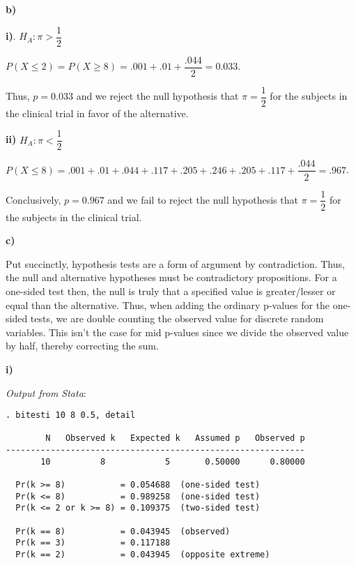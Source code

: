 \documentclass{article}
\begin{document}
\textbf{b)}


\textbf{i)}.  $H_A: \pi > \dfrac{1}{2}$

$P(X \leq 2)= P(X \geq 8)= .001 + .01 + \dfrac{.044}{2} = 0.033$.
\newline

Thus, $p = 0.033$ and we reject the null hypothesis that $\pi=\dfrac{1}{2}$ for the subjects in the clinical trial in favor of the alternative.

\textbf{ii)}  $H_A: \pi < \dfrac{1}{2}$

$P(X \leq 8)= .001+.01+.044+.117 +.205 +.246 +.205 +.117 +\dfrac{.044}{2}=.967$.

Conclusively, $p=0.967$ and we fail to reject the null hypothesis that $\pi=\dfrac{1}{2}$ for the subjects in the clinical trial.

\textbf{c)}

Put succinctly, hypothesis tests are a form of argument by contradiction. Thus, the null and alternative hypotheses must be contradictory propositions. For a one-sided test then, the null is truly that a specified value is greater/lesser or equal than the alternative. Thus, when adding the ordinary p-values for the one-sided tests, we are double counting the observed value for discrete random variables. This isn’t the case for mid p-values since we divide the observed value by half, thereby correcting the sum.

\textbf{i)}

\textit{Output from Stata}:

\begin{verbatim}
. bitesti 10 8 0.5, detail

        N   Observed k   Expected k   Assumed p   Observed p
------------------------------------------------------------
       10          8            5       0.50000      0.80000

  Pr(k >= 8)           = 0.054688  (one-sided test)
  Pr(k <= 8)           = 0.989258  (one-sided test)
  Pr(k <= 2 or k >= 8) = 0.109375  (two-sided test)

  Pr(k == 8)           = 0.043945  (observed)
  Pr(k == 3)           = 0.117188
  Pr(k == 2)           = 0.043945  (opposite extreme)

\end{verbatim}
\end{document}
